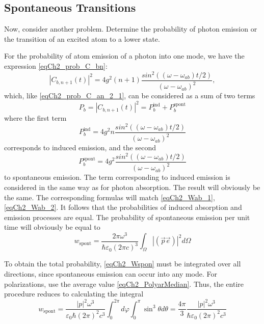 \subsection{Spontaneous Transitions}

Now, consider another problem. Determine the probability of photon emission or the transition of an excited atom to a lower state.  

For the probability of atom emission of a photon into one mode, we have the expression \eqref{eqCh2_prob_C_bn}:
\[
\left|C_{b, n + 1}\left(t\right)\right|^2 = 4 g^2 \left(n + 1\right)
\frac{sin^2\left(\left(\omega - \omega_{ab}\right)t/2\right)}
{\left(\omega - \omega_{ab}\right)^2},
\]
which, like \eqref{eqCh2_prob_C_an_2_1}, can be considered as a sum of two terms
\[
P_b = \left|C_{b, n + 1}\left(t\right)\right|^2 =
P_b^{\text{ind}} + P_b^{\text{spont}}
\]
where the first term
\[
P_b^{\text{ind}} = 4 g^2 n
\frac{sin^2\left(\left(\omega - \omega_{ab}\right)t/2\right)}
{\left(\omega - \omega_{ab}\right)^2}
\]
corresponds to induced emission, and the second
\[
P_b^{\text{spont}} = 4 g^2 
\frac{sin^2\left(\left(\omega - \omega_{ab}\right)t/2\right)}
{\left(\omega - \omega_{ab}\right)^2}
\]
to spontaneous emission. The term corresponding to induced emission is considered in the same way as for photon absorption. The result will obviously be the same. The corresponding formulas will match \eqref{eqCh2_Wab_1}, \eqref{eqCh2_Wab_2}. It follows that the probabilities of induced absorption and emission processes are equal. The probability of spontaneous emission per unit time will obviously be equal to 
\begin{equation}
w_{\text{spont}} = 
\frac{2 \pi \omega^3}
{\hbar \varepsilon_0 \left(2 \pi c\right)^3}
\int_{\Omega}
\left|\left(\vec{p} \vec{e}\right)\right|^2
d \Omega
\label{eqCh2_Wspon}
\end{equation}

To obtain the total probability, \eqref{eqCh2_Wspon} must be integrated over all directions, since spontaneous emission can occur into any mode. For polarizations, use the average value \eqref{eqCh2_PolyarMedian}. Thus, the entire procedure reduces to calculating the integral 
\begin{equation}
w_{\text{spont}} = 
\frac{\left|p\right|^2 \omega^3}
{\varepsilon_0 \hbar \left(2 \pi\right)^2 c^3}
\int_{0}^{2 \pi}d \varphi \int_0^{\pi}
\sin^3 \theta d \theta
= 
\frac{4 \pi}{3}\frac{\left|p\right|^2 \omega^3}
{\hbar \varepsilon_0 \left(2 \pi\right)^2 c^3}
\end{equation}

